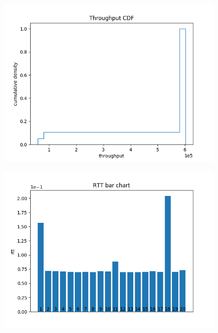\documentclass{article}
\begin{document}
\begin{figure}[h] \label{usrp-fails-6}
	\includegraphics[width=\textwidth]{usrp_fail_tp_cdf}	
\end{figure} 

\begin{figure}[h] \label{usrp-fails-1}
	\includegraphics[width=\textwidth]{usrp_fail_rtt_bar}
	
\end{figure} 
\end{document}
